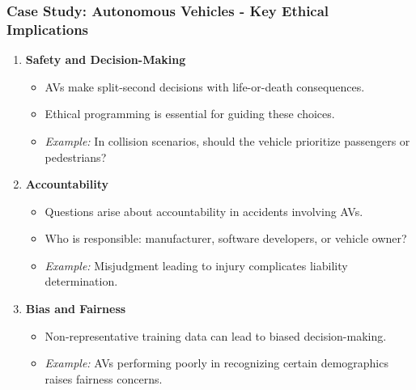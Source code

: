 \documentclass{beamer}
\begin{document}
\begin{frame}[fragile]
    \frametitle{Case Study: Autonomous Vehicles - Key Ethical Implications}
    \begin{enumerate}
        \item \textbf{Safety and Decision-Making}
        \begin{itemize}
            \item AVs make split-second decisions with life-or-death consequences.
            \item Ethical programming is essential for guiding these choices.
            \item \textit{Example:} In collision scenarios, should the vehicle prioritize passengers or pedestrians?
        \end{itemize}
        
        \item \textbf{Accountability}
        \begin{itemize}
            \item Questions arise about accountability in accidents involving AVs.
            \item Who is responsible: manufacturer, software developers, or vehicle owner?
            \item \textit{Example:} Misjudgment leading to injury complicates liability determination.
        \end{itemize}

        \item \textbf{Bias and Fairness}
        \begin{itemize}
            \item Non-representative training data can lead to biased decision-making.
            \item \textit{Example:} AVs performing poorly in recognizing certain demographics raises fairness concerns.
        \end{itemize}
    \end{enumerate}
\end{frame}
\end{document}
